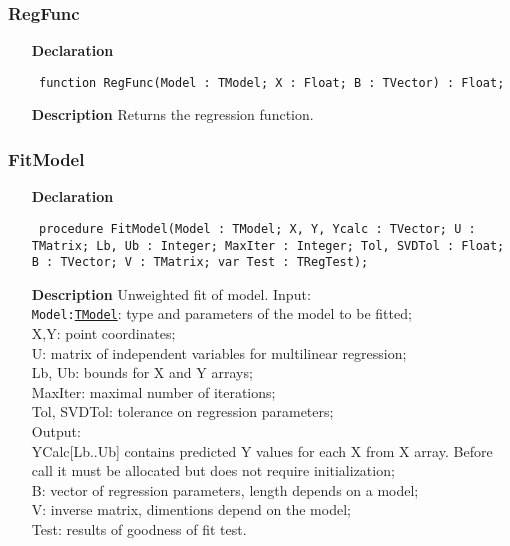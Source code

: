 \documentclass[12pt,a4paper,oneside]{report}
\newcommand{\declarationitem}[1]{\textbf{#1}}
\newcommand{\descriptiontitle}[1]{\textbf{#1}}
\newcommand{\code}[1]{\texttt{#1}}
\begin{document}
\subsubsection{RegFunc}
\label{umodels-RegFunc}
\begin{itemize}\item[\declarationitem{Declaration}\hfill]
	\begin{flushleft}
		\code{
			function RegFunc(Model : TModel; X : Float; B : TVector) : Float;}
		
	\end{flushleft}
	
	\par
	\item[\descriptiontitle{Description}]
	Returns the regression function. 	
\end{itemize}
\subsubsection{FitModel}
\label{umodels-FitModel}
\begin{itemize}\item[\declarationitem{Declaration}\hfill]
	\begin{flushleft}
		\code{
			procedure FitModel(Model : TModel; X, Y, Ycalc : TVector; U : TMatrix; Lb, Ub : Integer; MaxIter : Integer; Tol, SVDTol : Float; B : TVector; V : TMatrix; var Test : TRegTest);}
		
	\end{flushleft}
	
	\par
	\item[\descriptiontitle{Description}]
	Unweighted fit of model. 
	Input:\\
	\code{Model:\hyperref[umodels-TModel]{TModel}}: type and parameters of the model to be fitted;\\
	X,Y: point coordinates;\\
	U: matrix of independent variables for multilinear regression;\\
	Lb, Ub: bounds for X and Y arrays;\\
	MaxIter: maximal number of iterations;\\
	Tol, SVDTol: tolerance on regression parameters;\\
	
	Output:\\ YCalc[Lb..Ub] contains predicted Y values for each X from X array. Before call it must be allocated but does not require initialization;\\
	B: vector of regression parameters, length depends on a model;\\
	V: inverse matrix, dimentions depend on the model;\\
	Test: results of goodness of fit test.
	
\end{itemize}
\end{document}
